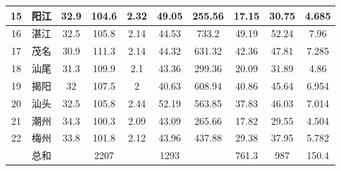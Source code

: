 \documentclass[UTF8,12pt]{ctexart}
\begin{document}
\begin{table}[H]
\begin{tabular}{cccccccccc}
                  \midrule
                  15     & 阳江     & 32.9   & 104.6  & 2.32   & 49.05  & 255.56 & 17.15  & 30.75  & 4.685 \\
                  \midrule
                  16     & 湛江     & 32.5   & 105.8  & 2.14   & 44.53  & 733.2  & 49.19  & 52.24  & 7.96 \\
                  \midrule
                  17     & 茂名     & 30.9   & 111.3  & 2.14   & 44.32  & 631.32 & 42.36  & 47.81  & 7.285 \\
                  \midrule
                  18     & 汕尾     & 31.3   & 109.9  & 2.1    & 43.36  & 299.36 & 20.09  & 31.89  & 4.86 \\
                  \midrule
                  19     & 揭阳     & 32     & 107.5  & 2      & 40.63  & 608.94 & 40.86  & 45.64  & 6.954 \\
                  \midrule
                  20     & 汕头     & 32.5   & 105.8  & 2.44   & 52.19  & 563.85 & 37.83  & 46.03  & 7.014 \\
                  \midrule
                  21     & 潮州     & 34.3   & 100.3  & 2.09   & 43.09  & 265.66 & 17.82  & 29.55  & 4.504 \\
                  \midrule
                  22     & 梅州     & 33.8   & 101.8  & 2.12   & 43.96  & 437.88 & 29.38  & 37.95  & 5.782 \\
                  \midrule
                         & 总和     &        & 2207   &        & 1293   &        & 761.3  & 987    & 150.4 \\
                  \bottomrule
                  \end{tabular}%
              \end{table}%
\end{document}
